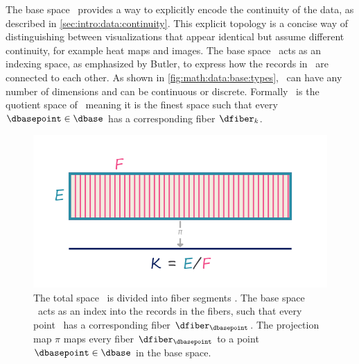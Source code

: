 \documentclass[../main.tex]{subfiles}
\begin{document}
The base space \dbase\ provides a way to explicitly encode the continuity of the data, as described in \autoref{sec:intro:data:continuity}. This explicit topology is a concise way of distinguishing between visualizations that appear identical but assume different continuity, for example heat maps and images. The base space \dbase\ acts as an indexing space, as emphasized by Butler\cite{butlerVectorBundleClassesForm1992,butlerVisualizationModelBased1989}, to express how the records in \dtotal\ are connected to each other. As shown in \autoref{fig:math:data:base:types}, \dbase\ can have any number of dimensions and can be continuous or discrete. Formally \dbase\ is the quotient space \cite{QuotientSpaceTopology2020} of \dtotal\, meaning it is the finest space\cite{aurouxMath131Introduction} such that every \(\dbasepoint \in \dbase\) has a corresponding fiber \(\dfiber_k\)\cite{QuotientSpaceTopology2020}. 

\begin{figure}[H]
    \includegraphics[width=\linewidth]{figures/math/k_qspace.png}
    \caption{The total space \dtotal\ is divided into fiber segments \dfiber. The base space \dbase\ acts as an index into the records in the fibers, such that every point \dbasepoint\ has a corresponding fiber \(\dfiber_{\dbasepoint}\). The projection map \(\pi\) maps every fiber \(\dfiber_{\dbasepoint}\) to a point \(\dbasepoint \in \dbase\) in the base space.}
    \label{fig:math:data:base:div}
\end{figure}
\end{document}
